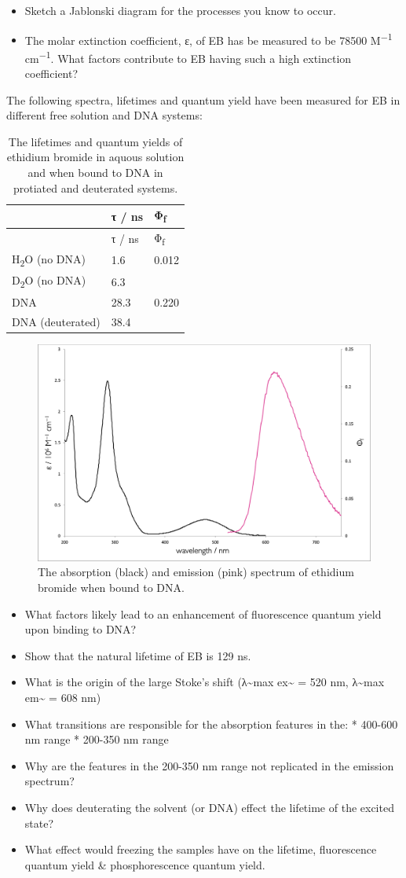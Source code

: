 \documentclass[
]{book}
\begin{document}
\begin{itemize}
\item
  Sketch a Jablonski diagram for the processes you know to occur.
\item
  The molar extinction coefficient, ε, of EB has be measured to be 78500 M\textsuperscript{−1} cm\textsuperscript{−1}. What factors contribute to EB having such a high extinction coefficient?
\end{itemize}

The following spectra, lifetimes and quantum yield have been measured for EB in different free solution and DNA systems:

\begin{longtable}[]{@{}lll@{}}
\caption{\label{tab:ethidiumlifetime} The lifetimes and quantum yields of ethidium bromide in aquous solution and when bound to DNA in protiated and deuterated systems.}\tabularnewline
\toprule
& τ / ns & Φ\textsubscript{f}\tabularnewline
\midrule
\endfirsthead
\toprule
& τ / ns & Φ\textsubscript{f}\tabularnewline
\midrule
\endhead
H\textsubscript{2}O (no DNA) & 1.6 & 0.012\tabularnewline
D\textsubscript{2}O (no DNA) & 6.3 &\tabularnewline
DNA & 28.3 & 0.220\tabularnewline
DNA (deuterated) & 38.4 &\tabularnewline
\bottomrule
\end{longtable}

\begin{figure}

{\centering \includegraphics[width=0.3\linewidth]{images/ethidiumspectra} 

}

\caption{The absorption (black) and emission (pink) spectrum of ethidium bromide when bound to DNA.}\label{fig:ethidiumspectra}
\end{figure}

\begin{itemize}
\item
  What factors likely lead to an enhancement of fluorescence quantum yield upon binding to DNA?
\item
  Show that the natural lifetime of EB is 129 ns.
\item
  What is the origin of the large Stoke's shift (λ\textasciitilde max ex\textasciitilde{} = 520 nm, λ\textasciitilde max em\textasciitilde{} = 608 nm)
\item
  What transitions are responsible for the absorption features in the:
  * 400-600 nm range
  * 200-350 nm range
\item
  Why are the features in the 200-350 nm range not replicated in the emission spectrum?
\item
  Why does deuterating the solvent (or DNA) effect the lifetime of the excited state?
\item
  What effect would freezing the samples have on the lifetime, fluorescence quantum yield \& phosphorescence quantum yield.
\end{itemize}
\end{document}
